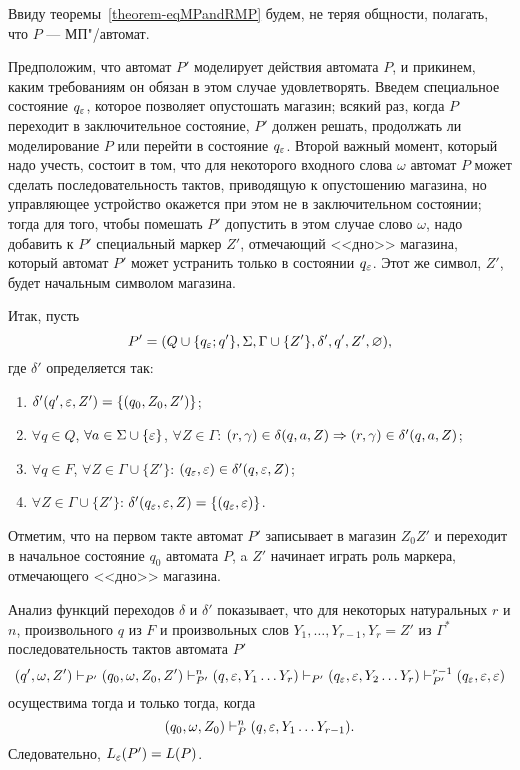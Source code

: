 \begin{myproof}
Ввиду теоремы~\ref{theorem-eqMPandRMP} будем, не теряя общности, полагать, что $P$ --- МП"/автомат.

Предположим, что автомат $P'$ моделирует действия автомата $P$, и прикинем, каким требованиям он обязан в этом случае удовлетворять. Введем специальное состояние $q_\varepsilon$, которое позволяет опустошать магазин; всякий раз, когда $P$ переходит в заключительное состояние, $P'$ должен решать, продолжать ли моделирование $P$ или перейти в состояние $q_\varepsilon$. Второй важный момент, который надо учесть, состоит в том, что для некоторого входного слова $\omega$ автомат $P$ может сделать последовательность тактов, приводящую к опустошению магазина, но управляющее устройство окажется при этом не в заключительном состоянии; тогда для того, чтобы помешать $P'$ допустить в этом случае слово $\omega$, надо добавить к $P'$ специальный маркер $Z'$, отмечающий <<дно>> магазина, который автомат $P'$ может устранить только в состоянии $q_\varepsilon$. Этот же символ, $Z'$, будет начальным символом магазина.

Итак, пусть
\[
P' = (Q\cup\{q_\varepsilon;q'\},\Sigma,\Gamma\cup\{Z'\},\delta',q',Z',\varnothing),
\]
где $\delta'$ определяется так:
\begin{enumerate}
    \item $\delta'(q',\varepsilon,Z')=\{(q_0,Z_0,Z')\}$;

    \item $\forall q\in Q$, $\forall a\in\Sigma\cup\{\varepsilon\}$,
    $\forall Z\in\Gamma$:
        $(r,\gamma)\in\delta(q,a,Z) \Rightarrow (r,\gamma)\in\delta'(q,a,Z)$;

    \item $\forall q\in F$, $\forall Z\in\Gamma\cup\{Z'\}$:
        $(q_\varepsilon,\varepsilon)\in\delta'(q,\varepsilon,Z)$;

    \item $\forall Z\in\Gamma\cup\{Z'\}$:
        $\delta'(q_\varepsilon,\varepsilon,Z)=\{(q_\varepsilon,\varepsilon)\}$.
\end{enumerate}

Отметим, что на первом такте автомат $P'$ записывает в магазин $Z_0Z'$ и переходит в начальное состояние $q_0$ автомата $P$, a $Z'$ начинает играть роль маркера, отмечающего <<дно>> магазина.

Анализ функций переходов $\delta$ и $\delta'$ показывает, что для некоторых натуральных $r$ и $n$, произвольного $q$ из $F$ и произвольных слов $Y_1, \ldots , Y_{r-1}, Y_r=Z'$ из $\Gamma^*$ последовательность тактов автомата $P'$
\[
    (q',\omega,Z')
        \vdash_{P'} (q_0,\omega,Z_0,Z')
        \vdash_{P'}^n (q,\varepsilon,Y_1 \ldots Y_r)
        \vdash_{P'} (q_\varepsilon,\varepsilon,Y_2 \ldots Y_r)
        \vdash_{P'}^{r-1} (q_\varepsilon,\varepsilon,\varepsilon)
\]
осуществима тогда и только тогда, когда
\[
    (q_0,\omega,Z_0) \vdash_P^n (q, \varepsilon, Y_1 \ldots Y_{r-1}).
\]
Следовательно, $L_\varepsilon(P')=L(P)$.
\end{myproof}


